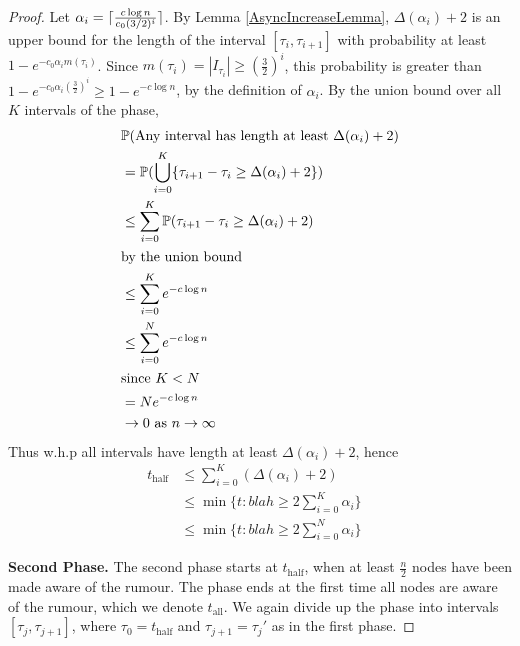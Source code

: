 \begin{proof}
	Let $\alpha_i = \lceil\frac{c \log n}{c_0 (3/2)^i}\rceil$. %
	By Lemma \ref{AsyncIncreaseLemma}, $\Delta(\alpha_i) + 2$ is an upper bound for the length of the interval $[\tau_i, \tau_{i+1}]$ 
	with probability at least $1 - e^{-c_0\alpha_i m(\tau_i)}$. %
	Since $m(\tau_i) = |I_{\tau_i}| \geq (\frac{3}{2})^i$, this probability is greater than $1 - e^{-c_0\alpha_i (\frac{3}{2})^i} \geq 1 - e^{-c \log n}$, by the definition of $\alpha_i$. By the union bound over all $K$ intervals of the phase,
	\begin{align*}
		& \mathbb{P}(\text{Any interval has length at least } \Delta(\alpha_i) + 2) \\
		&= \mathbb{P}(\bigcup_{i=0}^K \{\tau_{i+1} - \tau_i \geq \Delta(\alpha_i) + 2\}) \\
		&\leq \sum_{i=0}^K \mathbb{P}(\tau_{i+1} - \tau_i \geq \Delta(\alpha_i) + 2) \\
		\intertext{by the union bound}
		&\leq \sum_{i=0}^K e^{-c \log n} \\
		&\leq \sum_{i=0}^N e^{-c \log n} \\
		\intertext{since $K < N$}
		&= N e^{-c \log n} \\ %
		&\to 0 \text { as } n \to \infty
	\end{align*}
	Thus w.h.p all intervals have length at least $\Delta(\alpha_i) + 2$, hence
	\begin{align*}
		t_\text{half} &\leq \sum_{i=0}^K (\Delta(\alpha_i) + 2) \\
		&\leq \min \{t : blah \geq 2 \sum_{i=0}^K \alpha_i \} \\ %
		&\leq \min \{t : blah \geq 2 \sum_{i=0}^N \alpha_i \} & %
	\end{align*}




	\textbf{Second Phase.} The second phase starts at $t_\text{half}$, when at least $\frac{n}{2}$ nodes have been made aware of the rumour. The phase ends at the first time all nodes are aware of the rumour, which we denote $t_\text{all}$. We again divide up the phase into intervals $[\tau_j, \tau_{j+1}]$, where $\tau_0 = t_\text{half}$ and $\tau_{j+1} = \tau_j'$ as in the first phase.


\end{proof}

